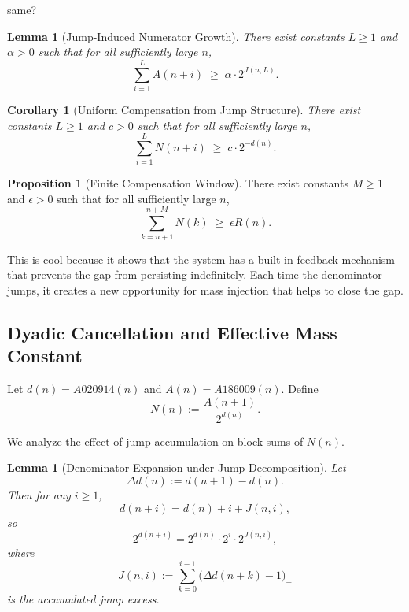 \documentclass[12pt, oneside]{article}
\numberwithin{equation}{section}
\theoremstyle{definition}
\newtheorem{proposition}{Proposition}[section]
\theoremstyle{plain}
\newtheorem{lemma}[theorem]{Lemma}
\newtheorem{corollary}[theorem]{Corollary}
\theoremstyle{remark}
\begin{document}
same?

\begin{lemma}[Jump-Induced Numerator Growth]
\label{lem:jump-num-growth}
There exist constants $L \ge 1$ and $\alpha > 0$ such that
for all sufficiently large $n$,
\[
\sum_{i=1}^{L} A(n+i)
\;\ge\;
\alpha \cdot 2^{J(n,L)}.
\]
\end{lemma}

\begin{corollary}[Uniform Compensation from Jump Structure]
There exist constants $L \ge 1$ and $c > 0$ such that
for all sufficiently large $n$,
\[
\sum_{i=1}^{L} N(n+i)
\;\ge\;
c \cdot 2^{-d(n)}.
\]
\end{corollary}


\begin{proposition}[Finite Compensation Window]
There exist constants $M \ge 1$ and $\epsilon > 0$ such that
for all sufficiently large $n$,
\[
\sum_{k=n+1}^{n+M} N(k)
\;\ge\;
\epsilon R(n).
\]
\end{proposition}


This is cool because it shows that the system has a built-in feedback mechanism
that prevents the gap from persisting indefinitely. Each time the denominator
jumps, it creates a new opportunity for mass injection that helps to close the gap.

\subsection{Dyadic Cancellation and Effective Mass Constant}
\label{subsec:dyadic-cancellation}

Let $d(n) = A020914(n)$ and $A(n) = A186009(n)$.
Define
\[
N(n) := \frac{A(n+1)}{2^{d(n)}}.
\]

We analyze the effect of jump accumulation on block sums of $N(n)$.


\begin{lemma}[Denominator Expansion under Jump Decomposition]
\label{lem:denominator-jump-expansion}
Let
\[
\Delta d(n) := d(n+1) - d(n).
\]
Then for any $i \ge 1$,
\[
d(n+i)
=
d(n) + i + J(n,i),
\]
so
\[
2^{d(n+i)}
=
2^{d(n)} \cdot 2^{i} \cdot 2^{J(n,i)},
\]
where
\[
J(n,i) := \sum_{k=0}^{i-1} \bigl(\Delta d(n+k) - 1\bigr)_+
\]
is the accumulated jump excess.
\end{lemma}

\end{document}
